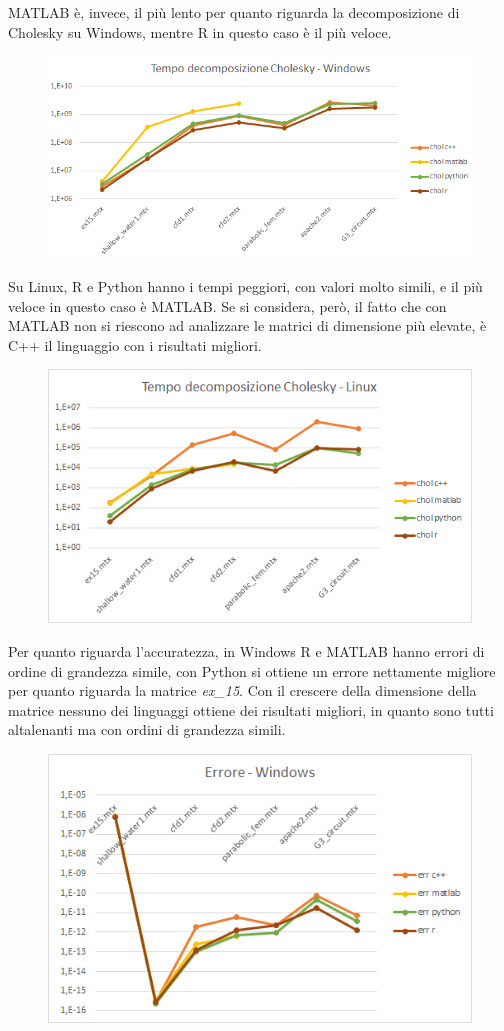 \documentclass[a4paper,12pt]{article}
\begin{document}
\noindent MATLAB è, invece, il più lento per quanto riguarda la decomposizione di Cholesky su Windows, mentre R in questo caso è il più veloce.
\bigskip

\begin{figure}[H]
\centering
  \includegraphics[width=0.8\linewidth]{img/tempocholwin.png}
\end{figure}

\noindent Su Linux, R e Python hanno i tempi peggiori, con valori molto simili, e il più veloce in questo caso è MATLAB. Se si considera, però, il fatto che con MATLAB non si riescono ad analizzare le matrici di dimensione più elevate, è C++ il linguaggio con i risultati migliori.

\begin{figure}[H]
\centering
  \includegraphics[width=0.75\linewidth]{img/tempochollinux.png}
\end{figure}


\noindent Per quanto riguarda l'accuratezza, in Windows R e MATLAB hanno errori di ordine di grandezza simile, con Python si ottiene un errore nettamente migliore per quanto riguarda la matrice \textit{ex\_15}. Con il crescere della dimensione della matrice nessuno dei linguaggi ottiene dei risultati migliori, in quanto sono tutti altalenanti ma con ordini di grandezza simili.
\bigskip

\begin{figure}[H]
\centering
  \includegraphics[width=0.75\linewidth]{img/errwin.png}
\end{figure}
\end{document}
